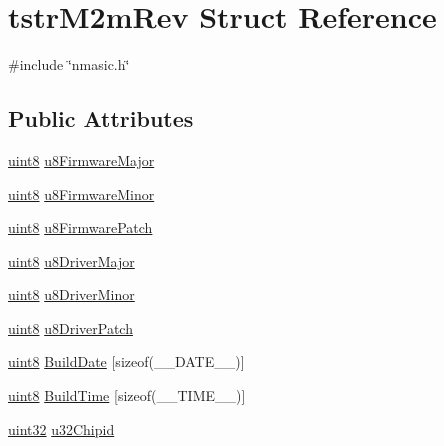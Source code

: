 \hypertarget{structtstrM2mRev}{}\section{tstr\+M2m\+Rev Struct Reference}
\label{structtstrM2mRev}


{\ttfamily \#include \char`\"{}nmasic.\+h\char`\"{}}

\subsection*{Public Attributes}
\begin{DoxyCompactItemize}
\item 
\hyperlink{group__DataT_ga4df709a77647e870bbf1d955b8edc9a6}{uint8} \hyperlink{structtstrM2mRev_af17c74f7ee2a0612a3321fd3d1297e8e}{u8\+Firmware\+Major}
\item 
\hyperlink{group__DataT_ga4df709a77647e870bbf1d955b8edc9a6}{uint8} \hyperlink{structtstrM2mRev_a9647011c59d10a38acd1ab70c26353aa}{u8\+Firmware\+Minor}
\item 
\hyperlink{group__DataT_ga4df709a77647e870bbf1d955b8edc9a6}{uint8} \hyperlink{structtstrM2mRev_aa8be74043435e22e858ffb916abd83c2}{u8\+Firmware\+Patch}
\item 
\hyperlink{group__DataT_ga4df709a77647e870bbf1d955b8edc9a6}{uint8} \hyperlink{structtstrM2mRev_aec68edb68ce1a472a6703ed709f7ae30}{u8\+Driver\+Major}
\item 
\hyperlink{group__DataT_ga4df709a77647e870bbf1d955b8edc9a6}{uint8} \hyperlink{structtstrM2mRev_a8e1f683bdcfc41fc133cecc73e9de4ed}{u8\+Driver\+Minor}
\item 
\hyperlink{group__DataT_ga4df709a77647e870bbf1d955b8edc9a6}{uint8} \hyperlink{structtstrM2mRev_ad67217ead03e5230092147bea0d8e9d3}{u8\+Driver\+Patch}
\item 
\hyperlink{group__DataT_ga4df709a77647e870bbf1d955b8edc9a6}{uint8} \hyperlink{structtstrM2mRev_a495ca1b146e9596e0f65ace99f663934}{Build\+Date} \mbox{[}sizeof(\+\_\+\+\_\+\+D\+A\+T\+E\+\_\+\+\_\+)\mbox{]}
\item 
\hyperlink{group__DataT_ga4df709a77647e870bbf1d955b8edc9a6}{uint8} \hyperlink{structtstrM2mRev_abb8e31ceb2483c78fb14e87dd7eb64ee}{Build\+Time} \mbox{[}sizeof(\+\_\+\+\_\+\+T\+I\+M\+E\+\_\+\+\_\+)\mbox{]}
\item 
\hyperlink{group__DataT_ga100e7c691a47d6978527c479a0158245}{uint32} \hyperlink{structtstrM2mRev_a3c347a43e00bcdfa90011826c6b5ea75}{u32\+Chipid}
\end{DoxyCompactItemize}


